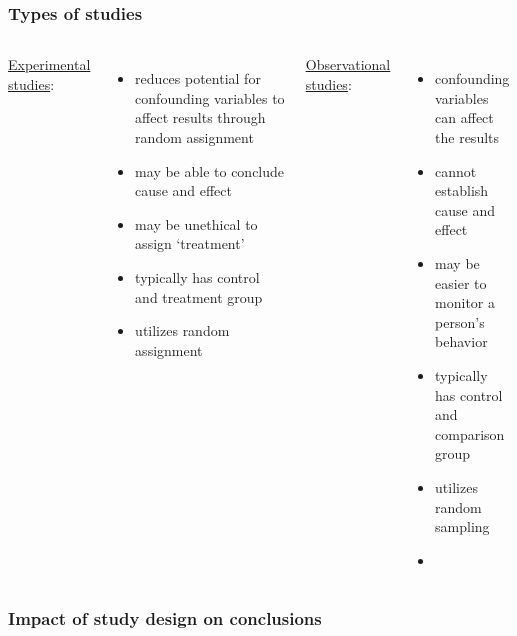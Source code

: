 \begin{frame}
\frametitle{Types of studies}
\begin{columns}
\underline{Experimental studies}:
\begin{itemize}
    \item
    reduces potential for confounding variables to affect results through random assignment
    \item
    may be able to conclude cause and effect
    \item
    may be unethical to assign `treatment'
    \item
    typically has control and treatment group
    \item
    utilizes random assignment
\end{itemize}
\underline{Observational studies}:
\begin{itemize}
    \item
    confounding variables can affect the results
    \item
    cannot establish cause and effect
    \item
    may be easier to monitor a person's behavior
    \item
    typically has control and comparison group
    \item
    utilizes random sampling
    \item[]
\end{itemize}
\end{columns}
\end{frame}


\begin{frame}
\frametitle{Impact of study design on conclusions}
\end{frame}


